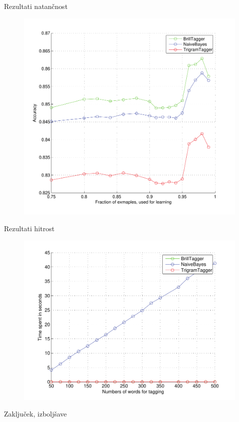 \documentclass{beamer}
\begin{document}
\begin{frame}{Rezultati natančnost}
\begin{figure}[h]
\begin{center}
\includegraphics[height=0.85\textheight]{../evaluation/graph.pdf} 
\end{center}
\end{figure}
\end{frame}

\begin{frame}{Rezultati hitrost}
\begin{figure}[h]
\begin{center}
\includegraphics[height=0.85\textheight]{../evaluation/graph_speed.pdf} 
\end{center}
\end{figure}
\end{frame}

\begin{frame}{Zaključek, izboljšave}
\end{frame}
\end{document}
